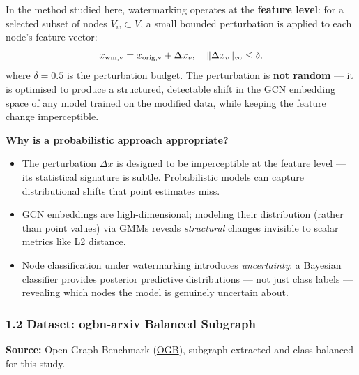 \documentclass[11pt]{article}
\providecommand{\tightlist}{%
      \setlength{\itemsep}{0pt}\setlength{\parskip}{0pt}}
\begin{document}
In the method studied here, watermarking operates at the \textbf{feature
level}: for a selected subset of nodes \(V_w \subset V\), a small
bounded perturbation is applied to each node's feature vector: \[
x_{\rm wm,v} = x_{\rm orig,v} + \Delta x_v, \quad \|\Delta x_v\|_\infty \leq \delta,
\] where \(\delta = 0.5\) is the perturbation budget. The perturbation
is \textbf{not random} --- it is optimised to produce a structured,
detectable shift in the GCN embedding space of any model trained on the
modified data, while keeping the feature change imperceptible.

\textbf{Why is a probabilistic approach appropriate?}

\begin{itemize}
\tightlist
\item
  The perturbation \(\Delta x\) is designed to be imperceptible at the
  feature level --- its statistical signature is subtle. Probabilistic
  models can capture distributional shifts that point estimates miss.
\item
  GCN embeddings are high-dimensional; modeling their distribution
  (rather than point values) via GMMs reveals \emph{structural} changes
  invisible to scalar metrics like L2 distance.
\item
  Node classification under watermarking introduces \emph{uncertainty}:
  a Bayesian classifier provides posterior predictive distributions ---
  not just class labels --- revealing which nodes the model is genuinely
  uncertain about.
\end{itemize}

    \subsubsection{1.2 Dataset: ogbn-arxiv Balanced
Subgraph}\label{dataset-ogbn-arxiv-balanced-subgraph}

\textbf{Source:} Open Graph Benchmark
(\href{https://ogb.stanford.edu/docs/nodeprop/\#ogbn-arxiv}{OGB}),
subgraph extracted and class-balanced for this study.
\end{document}

